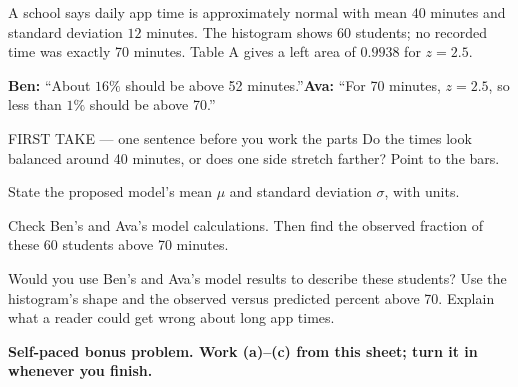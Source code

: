 \documentclass[14pt]{extarticle}
\begin{document}
\pagestyle{empty}


\noindent\begin{minipage}[t]{0.57\linewidth}
\vspace{0pt}
A school says daily app time is approximately normal with mean $40$ minutes and standard deviation $12$ minutes. The histogram shows 60 students; no recorded time was exactly 70 minutes. Table A gives a left area of $0.9938$ for $z=2.5$.\par\smallskip \textbf{Ben:} ``About $16\%$ should be above 52 minutes.''\quad \textbf{Ava:} ``For 70 minutes, $z=2.5$, so less than $1\%$ should be above 70.''\par
\end{minipage}\hfill
\begin{minipage}[t]{0.40\linewidth}
\vspace{0pt}
\begin{center}
\end{center}
\end{minipage}

\begin{firsttakebox}{FIRST TAKE --- one sentence before you work the parts}
Do the times look balanced around 40 minutes, or does one side stretch farther? Point to the bars.
\end{firsttakebox}

\begin{description}[leftmargin=1.15in, labelwidth=1in, itemsep=2pt, topsep=2pt]
  \item[\dokbadge{1}~(a)] State the proposed model's mean $\mu$ and standard deviation $\sigma$, with units.
  \item[\dokbadge{2}~(b)] Check Ben's and Ava's model calculations. Then find the observed fraction of these 60 students above 70 minutes.
  \item[\dokbadge{3}~(c)] Would you use Ben's and Ava's model results to describe these students? Use the histogram's shape and the observed versus predicted percent above 70. Explain what a reader could get wrong about long app times.
\end{description}

\vfill
\textbf{Self-paced bonus problem. Work (a)--(c) from this sheet; turn it in whenever you finish.}
\end{document}
